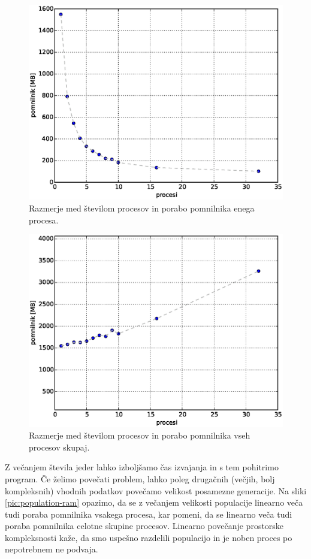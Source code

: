 \documentclass[a4paper,12pt]{book}
\begin{document}
\begin{figure}	
	\centering
	\includegraphics[scale=0.5]{res/processes-ram.eps}
	\caption{Razmerje med številom procesov in porabo pomnilnika enega procesa. }
	\label{pic:processes-ram}
\end{figure}
\begin{figure}
	\centering
	\includegraphics[scale=0.5]{res/processes-ram-normalized.eps}
	\caption{Razmerje med številom procesov in porabo pomnilnika vseh procesov skupaj. }
	\label{pic:processes-ram-normalized}
\end{figure}

Z večanjem števila jeder lahko izboljšamo čas izvajanja in s tem pohitrimo program. Če želimo povečati problem, lahko poleg drugačnih (večjih, bolj kompleksnih) vhodnih podatkov povečamo velikost posamezne generacije. Na sliki \ref{pic:population-ram} opazimo, da se z večanjem velikosti populacije linearno veča tudi poraba pomnilnika vsakega procesa, kar pomeni, da se linearno veča tudi poraba pomnilnika celotne skupine procesov. Linearno povečanje prostorske kompleksnosti kaže, da smo uspešno razdelili populacijo in je noben proces po nepotrebnem ne podvaja. 
\end{document}
